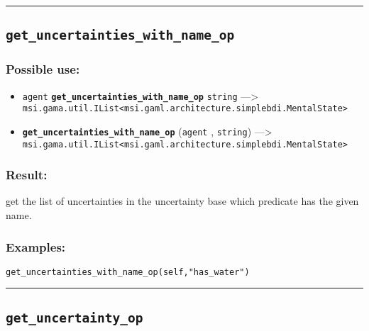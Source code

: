 \documentclass[]{book}
\providecommand{\tightlist}{%
  \setlength{\itemsep}{0pt}\setlength{\parskip}{0pt}}
\theoremstyle{definition}
\theoremstyle{definition}
\theoremstyle{definition}
\theoremstyle{remark}
\begin{document}
\begin{center}\rule{0.5\linewidth}{\linethickness}\end{center}

\subsection{\texorpdfstring{\texttt{get\_uncertainties\_with\_name\_op}}{get\_uncertainties\_with\_name\_op}}\label{get_uncertainties_with_name_op}

\subsubsection{Possible use:}\label{possible-use-233}

\begin{itemize}
\tightlist
\item
  \texttt{agent} \textbf{\texttt{get\_uncertainties\_with\_name\_op}}
  \texttt{string} ---\textgreater{}
  \texttt{msi.gama.util.IList\textless{}msi.gaml.architecture.simplebdi.MentalState\textgreater{}}
\item
  \textbf{\texttt{get\_uncertainties\_with\_name\_op}} (\texttt{agent} ,
  \texttt{string}) ---\textgreater{}
  \texttt{msi.gama.util.IList\textless{}msi.gaml.architecture.simplebdi.MentalState\textgreater{}}
\end{itemize}

\subsubsection{Result:}\label{result-225}

get the list of uncertainties in the uncertainty base which predicate
has the given name.

\subsubsection{Examples:}\label{examples-178}

\begin{verbatim}
get_uncertainties_with_name_op(self,"has_water") 
\end{verbatim}

\begin{center}\rule{0.5\linewidth}{\linethickness}\end{center}

\subsection{\texorpdfstring{\texttt{get\_uncertainty\_op}}{get\_uncertainty\_op}}\label{get_uncertainty_op}
\end{document}
